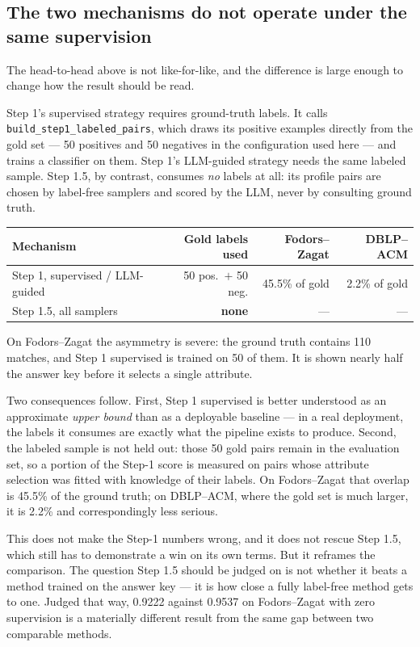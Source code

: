 \documentclass[11pt]{article}
\begin{document}
\subsection{The two mechanisms do not operate under the same supervision}
\label{sec:supervision}

The head-to-head above is not like-for-like, and the difference is large enough to
change how the result should be read.

Step 1's supervised strategy requires ground-truth labels. It calls
\texttt{build\_step1\_labeled\_pairs}, which draws its positive examples directly from
the gold set --- 50 positives and 50 negatives in the configuration used here --- and
trains a classifier on them. Step 1's LLM-guided strategy needs the same labeled
sample. Step 1.5, by contrast, consumes \emph{no} labels at all: its profile pairs are
chosen by label-free samplers and scored by the LLM, never by consulting ground truth.

\begin{center}
\small
\begin{tabular}{lrrr}
\toprule
Mechanism & Gold labels used & Fodors--Zagat & DBLP--ACM \\
\midrule
Step 1, supervised / LLM-guided & 50 pos.\ $+$ 50 neg. & 45.5\% of gold & 2.2\% of gold \\
Step 1.5, all samplers & \textbf{none} & --- & --- \\
\bottomrule
\end{tabular}
\end{center}

On Fodors--Zagat the asymmetry is severe: the ground truth contains 110 matches, and
Step 1 supervised is trained on 50 of them. It is shown nearly half the answer key
before it selects a single attribute.

Two consequences follow. First, Step 1 supervised is better understood as an
approximate \emph{upper bound} than as a deployable baseline --- in a real
deployment, the labels it consumes are exactly what the pipeline exists to produce.
Second, the labeled sample is not held out: those 50 gold pairs remain in the
evaluation set, so a portion of the Step-1 score is measured on pairs whose
attribute selection was fitted with knowledge of their labels. On Fodors--Zagat that
overlap is 45.5\% of the ground truth; on DBLP--ACM, where the gold set is much
larger, it is 2.2\% and correspondingly less serious.

This does not make the Step-1 numbers wrong, and it does not rescue Step 1.5, which
still has to demonstrate a win on its own terms. But it reframes the comparison. The
question Step 1.5 should be judged on is not whether it beats a method trained on the
answer key --- it is how close a fully label-free method gets to one. Judged that way,
0.9222 against 0.9537 on Fodors--Zagat with zero supervision is a materially different
result from the same gap between two comparable methods.
\end{document}
